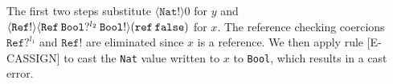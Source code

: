 The first two steps substitute $\langle \texttt{Nat}! \rangle 0$ for $y$ and 
$\langle \texttt{Ref}! \rangle \langle \texttt{Ref} \hspace{0.2em} \texttt{Bool}? ^{l_2} \hspace{0.2em} \texttt{Bool}! \rangle 
(\texttt{ref} \hspace{0.2em} \texttt{false})$ 
for $x$. The reference checking coercions $\texttt{Ref}? ^{l_1}$ and $\texttt{Ref}!$ are eliminated 
since $x$ is a reference. We then apply rule {\scriptsize{[E-CASSIGN]}} 
to cast the \texttt{Nat} value written to $x$ to \texttt{Bool}, which results in a cast error.
